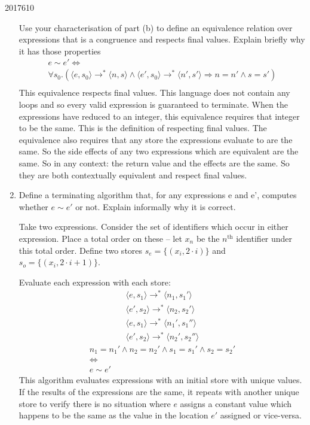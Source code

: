 \documentclass[10pt,\jkfside,a4paper]{article}
\begin{document}
\begin{examquestion}{2017}{6}{10}
\begin{enumerate}[label=(\alph*)]
Use your characterisation of part (b) to define an equivalence relation over
expressions that is a congruence and respects final values. Explain briefly
why it has those properties
\begin{gather*}
e \sim e' \Longleftrightarrow \\
\forall s_0. (\langle e, s_0 \rangle \longrightarrow^* \langle n, s \rangle \wedge
\langle e', s_0 \rangle \longrightarrow^* \langle n', s' \rangle
\Longrightarrow
n = n' \wedge s = s') \\
\end{gather*}
This equivalence respects final values. This language does not contain any
loops and so every valid expression is guaranteed to terminate.
When the expressions have reduced to an integer, this equivalence requires
that integer to be the same. This is the definition of respecting final
values. The equivalence also requires that any store the expressions
evaluate to are the same. So the side effects of any two expressions which
are equivalent are the same. So in any context: the return value and the
effects are the same. So they are both contextually equivalent and respect
final values.

\item Define a terminating algorithm that, for any expressions e and e',
computes whether $e \sim e'$ or not. Explain informally why it is correct.

Take two expressions. Consider the set of identifiers which occur in either
expression. Place a total order on these -- let $x_n$ be the $n^{\text{th}}$
identifier under this total order. Define two stores $s_e = \{(x_i, 2 \cdot i
)\}$ and $s_o = \{(x_i, 2 \cdot i + 1)\}$.

Evaluate each expression with each store:
\begin{align*}
\langle e, s_1 \rangle \longrightarrow^* \langle n_1, s_1' \rangle \\
\langle e', s_2 \rangle \longrightarrow^* \langle n_2, s_2' \rangle \\
\langle e, s_1 \rangle \longrightarrow^* \langle n_1', s_1'' \rangle \\
\langle e', s_2 \rangle \longrightarrow^* \langle n_2', s_2'' \rangle
\end{align*}
\begin{gather*}
n_1 = n_1' \wedge n_2 = n_2' \wedge s_1 = s_1' \wedge s_2 = s_2' \\
\Longleftrightarrow \\
e \sim e'
\end{gather*}
This algorithm evaluates expressions with an initial store with unique
values. If the results of the expressions are the same, it repeats with
another unique store to verify there is no situation where $e$ assigns a
constant value which happens to be the same as the value in the location
$e'$ assigned or vice-versa.


\end{enumerate}
\end{examquestion}
\end{document}
